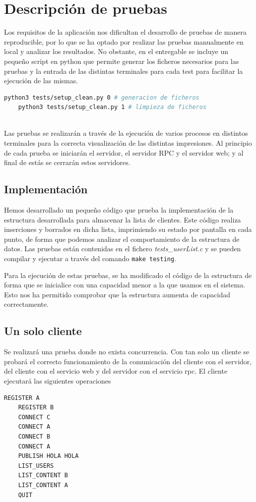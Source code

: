 \documentclass[]{article}
\begin{document}
\section{Descripción de pruebas}
\label{sec:descripcion_de_pruebas}
Los requisitos de la aplicación nos dificultan el desarrollo de pruebas de manera reproducible, por lo que se ha optado por realizar las pruebas manualmente en local y analizar los resultados. No obstante, en el entregable se incluye un pequeño script en python que permite generar los ficheros necesarios para las pruebas y la entrada de las distintas terminales para cada test para facilitar la ejecución de las mismas.

\begin{lstlisting}[caption=Generar/limpiar ficheros de prueba y entradas de terminal, language=bash]
    python3 tests/setup_clean.py 0 # generacion de ficheros
    python3 tests/setup_clean.py 1 # limpieza de ficheros
    
\end{lstlisting}

Las pruebas se realizarán a través de la ejecución de varios procesos en distintos terminales para la correcta visualización de las distintas impresiones. Al principio de cada prueba se iniciarán el servidor, el servidor RPC y el servidor web; y al final de estás se cerrarán estos servidores.
\subsection{Implementación}
\label{subsec:imp}
Hemos desarrollado un pequeño código que prueba la implementación de la estructura desarrollada para almacenar la lista de clientes. Este código realiza inserciones y borrados en dicha lista, imprimiendo su estado por pantalla en cada punto, de forma que podemos analizar el comportamiento de la estructura de datos. Las pruebas están contenidas en el fichero \textit{tests\_userList.c} y se pueden compilar y ejecutar a través del comando \texttt{make testing}. 

Para la ejecución de estas pruebas, se ha modificado el código de la estructura de forma que se inicialice con una capacidad menor a la que usamos en el sistema. Esto nos ha permitido comprobar que la estructura aumenta de capacidad correctamente.

\subsection{Un solo cliente}
\label{subsection:1_cliente}
Se realizará una prueba donde no exista concurrencia. Con tan solo un cliente se probará el correcto funcionamiento de la comunicación del cliente con el servidor, del cliente con el servicio web y del servidor con el servicio rpc.
El cliente ejecutará las siguientes operaciones
\begin{lstlisting}[caption=Operaciones a realizar por el cliente]
    REGISTER A
    REGISTER B
    CONNECT C
    CONNECT A
    CONNECT B
    CONNECT A
    PUBLISH HOLA HOLA 
    LIST_USERS
    LIST_CONTENT B
    LIST_CONTENT A
    QUIT
\end{lstlisting}
\end{document}
